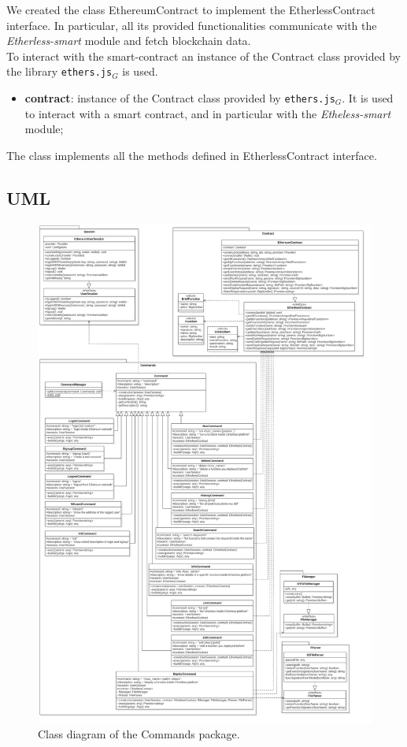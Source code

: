 			We created the class EthereumContract to implement the EtherlessContract interface. In particular, all its provided functionalities communicate with the \textit{Etherless-smart} module and fetch blockchain data. \\ To interact with the smart-contract an instance of the Contract class provided by the library \texttt{ethers.js}$_{G}$ is used.
					\begin{itemize}
						\item \textbf{contract}: instance of the Contract class provided by \texttt{ethers.js}$_{G}$. It is used to interact with a smart contract, and in particular with the \textit{Etheless-smart} module; 
					\end{itemize}
				
					The class implements all the methods defined in EtherlessContract interface.
	
	\subsection{UML}
	\begin{figure} [H]
		\centering
		\includegraphics[width=0.85\linewidth]{diagrammi/etherless-cli/Classi}
		\caption{Class diagram of the Commands package.}
	\end{figure}
			
